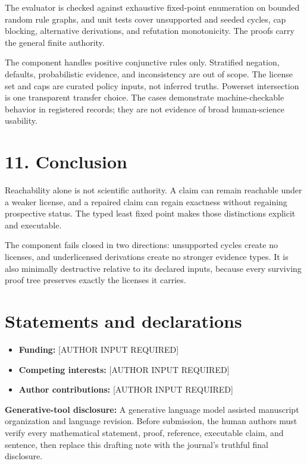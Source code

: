 \documentclass[
  11pt,
]{article}
\providecommand{\tightlist}{%
  \setlength{\itemsep}{0pt}\setlength{\parskip}{0pt}}
\begin{document}
The evaluator is checked against exhaustive fixed-point enumeration on
bounded random rule graphs, and unit tests cover unsupported and seeded
cycles, cap blocking, alternative derivations, and refutation
monotonicity. The proofs carry the general finite authority.

The component handles positive conjunctive rules only. Stratified
negation, defaults, probabilistic evidence, and inconsistency are out of
scope. The license set and caps are curated policy inputs, not inferred
truths. Powerset intersection is one transparent transfer choice. The
cases demonstrate machine-checkable behavior in registered records; they
are not evidence of broad human-science usability.

\hypertarget{conclusion}{%
\section{11. Conclusion}\label{conclusion}}

Reachability alone is not scientific authority. A claim can remain
reachable under a weaker license, and a repaired claim can regain
exactness without regaining prospective status. The typed least fixed
point makes those distinctions explicit and executable.

The component fails closed in two directions: unsupported cycles create
no licenses, and underlicensed derivations create no stronger evidence
types. It is also minimally destructive relative to its declared inputs,
because every surviving proof tree preserves exactly the licenses it
carries.

\hypertarget{statements-and-declarations}{%
\section{Statements and
declarations}\label{statements-and-declarations}}

\begin{itemize}
\tightlist
\item
  \textbf{Funding:} {[}AUTHOR INPUT REQUIRED{]}
\item
  \textbf{Competing interests:} {[}AUTHOR INPUT REQUIRED{]}
\item
  \textbf{Author contributions:} {[}AUTHOR INPUT REQUIRED{]}
\end{itemize}

\textbf{Generative-tool disclosure:} A generative language model
assisted manuscript organization and language revision. Before
submission, the human authors must verify every mathematical statement,
proof, reference, executable claim, and sentence, then replace this
drafting note with the journal's truthful final disclosure.
\end{document}
